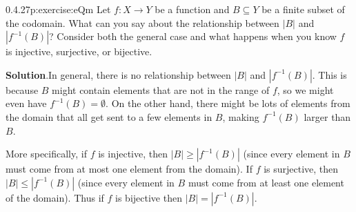 \documentclass[twoside,11pt,]{book}
\newcommand{\blocktitlefont}{\relax}
\numberwithin{equation}{chapter}
\newcommand{\inv}{^{-1}}
\newcommand{\card}[1]{\left| #1 \right|}
\begin{document}
\begin{divisionsolution}{0.4.27}{}{p:exercise:eQm}%
Let \(f:X \to Y\) be a function and \(B \subseteq Y\) be a finite subset of the codomain. What can you say about the relationship between \(\card{B}\) and \(\card{f\inv(B)}\)? Consider both the general case and what happens when you know \(f\) is injective, surjective, or bijective.%
\par\smallskip%
\noindent\textbf{\blocktitlefont Solution}.\quad{}In general, there is no relationship between \(\card{B}\) and \(\card{f\inv(B)}\). This is because \(B\) might contain elements that are not in the range of \(f\), so we might even have \(f\inv(B) = \emptyset\). On the other hand, there might be lots of elements from the domain that all get sent to a few elements in \(B\), making \(f\inv(B)\) larger than \(B\).%
\par
More specifically, if \(f\) is injective, then \(\card{B} \ge \card{f\inv(B)}\) (since every element in \(B\) must come from at most one element from the domain). If \(f\) is surjective, then \(\card{B} \le \card{f\inv(B)}\) (since every element in \(B\) must come from at least one element of the domain). Thus if \(f\) is bijective then \(\card{B} = \card{f\inv(B)}\).%
\end{divisionsolution}%
\end{document}
